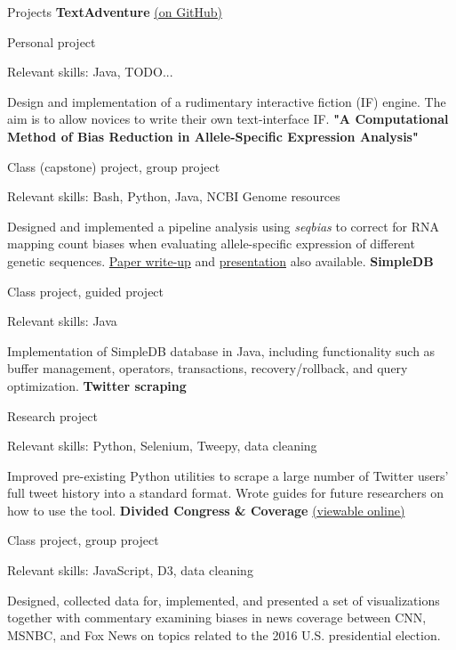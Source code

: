 \begin{rubric}{Projects}
\entry*[2019] %
	\textbf{TextAdventure} \href{https://github.com/cephcyn/TextAdventure}{(on GitHub)}
	\par Personal project
	\par Relevant skills: Java, TODO...
	\par Design and implementation of a rudimentary interactive fiction (IF) engine. The aim is to allow novices to write their own text-interface IF.
\entry*[2019] %
	\textbf{"A Computational Method of Bias Reduction in Allele-Specific Expression Analysis"} %
	\par Class (capstone) project, group project
	\par Relevant skills: Bash, Python, Java, NCBI Genome resources
	\par Designed and implemented a pipeline analysis using \textit{seqbias} to correct for RNA mapping count biases when evaluating allele-specific expression of different genetic sequences. \href{https://github.com/cephcyn/cephcyn.github.io/raw/master/documents/u_cse428/ASE_Report.pdf}{Paper write-up} and \href{https://github.com/cephcyn/cephcyn.github.io/raw/master/documents/u_cse428/ASE_Presentation.pptx}{presentation} also available.
\entry*[2019] %
	\textbf{SimpleDB} %
	\par Class project, guided project
	\par Relevant skills: Java
	\par Implementation of SimpleDB database in Java, including functionality such as buffer management, operators, transactions, recovery/rollback, and query optimization.
\entry*[2018] %
	\textbf{Twitter scraping} %
	\par Research project
	\par Relevant skills: Python, Selenium, Tweepy, data cleaning
	\par Improved pre-existing Python utilities to scrape a large number of Twitter users' full tweet history into a standard format. Wrote guides for future researchers on how to use the tool.
\entry*[2018] %
	\textbf{Divided Congress \& Coverage} \href{https://cse442-18f.github.io/fp-divided-congress-and-coverage/}{(viewable online)} %
	\par Class project, group project
	\par Relevant skills: JavaScript, D3, data cleaning
	\par Designed, collected data for, implemented, and presented a set of visualizations together with commentary examining biases in news coverage between CNN, MSNBC, and Fox News on topics related to the 2016 U.S. presidential election.

\end{rubric}
